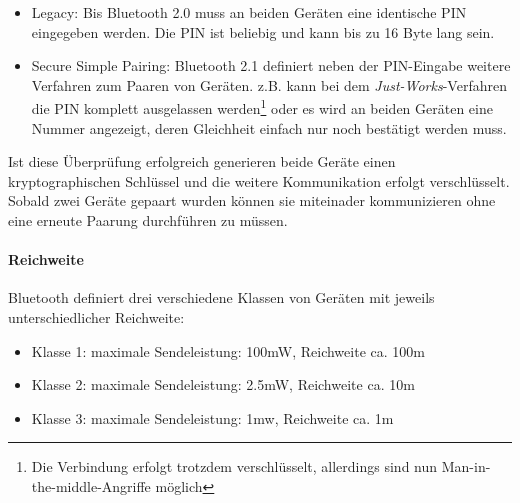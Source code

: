                 \begin{itemize}
                    \item{Legacy:} Bis Bluetooth 2.0 muss an beiden Geräten eine identische PIN
                                   eingegeben werden. Die PIN ist beliebig und kann bis zu
                                   16 Byte lang sein.
                    \item{Secure Simple Pairing:} Bluetooth 2.1 definiert neben der PIN-Eingabe
                                                  weitere Verfahren zum Paaren von Geräten.
                                                  z.B. kann bei dem \textsl{Just-Works}-Verfahren
                                                  die PIN komplett ausgelassen werden\footnote{Die
                                                  Verbindung erfolgt trotzdem verschlüsselt,
                                                  allerdings sind nun Man-in-the-middle-Angriffe 
                                                  möglich} oder es wird an beiden Geräten eine
                                                  Nummer angezeigt, deren Gleichheit einfach
                                                  nur noch bestätigt werden muss.
                \end{itemize}

                Ist diese Überprüfung erfolgreich generieren beide Geräte einen kryptographischen
                Schlüssel und die weitere Kommunikation erfolgt verschlüsselt. Sobald zwei
                Geräte gepaart wurden können sie miteinader kommunizieren ohne eine erneute
                Paarung durchführen zu müssen.

            \paragraph{Reichweite}
                Bluetooth definiert drei verschiedene Klassen von Geräten mit jeweils
                unterschiedlicher Reichweite:

                \begin{itemize}
                    \item{Klasse 1:} maximale Sendeleistung: 100mW, Reichweite ca. 100m
                    \item{Klasse 2:} maximale Sendeleistung: 2.5mW, Reichweite ca. 10m
                    \item{Klasse 3:} maximale Sendeleistung:   1mw, Reichweite ca. 1m
                \end{itemize}

